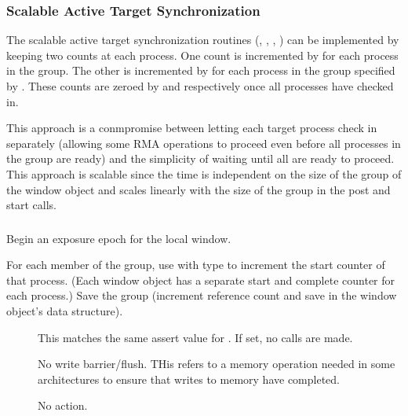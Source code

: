 \documentclass{article}
\begin{document}
\subsubsection{Scalable Active Target Synchronization}
The scalable active target synchronization routines (,
, , )
can be implemented by keeping two counts at each process.  One count is
incremented by  for each process in the group.  
The other is incremented by  for each process in the
group specified by .  These counts are zeroed by
 and  respectively once all
processes have checked in.

This approach is a conmpromise between letting each target process check in
separately (allowing some RMA operations to proceed even before all processes
in the group are ready) and the simplicity of waiting until all are ready to
proceed.  This approach is scalable since the time is independent on the size
of the group of the window object and scales linearly with the size of the
group in the post and start calls.  


\subsubsection{}
Begin an exposure epoch for the local window.

For each member of the group, use  with type
 to increment the start counter of that
process.  (Each window object has a separate start and complete counter for
each process.)
Save the group (increment reference count and save in the window object's data structure).


\begin{description}
\item[]This matches the same assert value for
  .  If set, no  calls are made.
\item[]No write barrier/flush.  THis refers to a
  memory operation needed in some architectures to ensure that writes to
  memory have completed.
\item[]No action.
\end{description}
\end{document}
